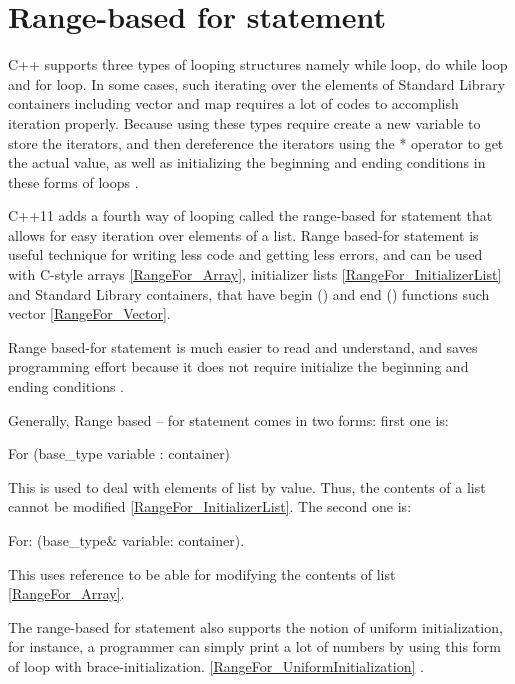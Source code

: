 \documentclass[11pt]{report}
\begin{document}
\section{Range-based for statement}
\label{section: Range-based for statement}
C++ supports three types of looping structures namely while loop, do while loop and for loop. In some cases, such iterating over the elements of Standard Library containers including vector and map requires a lot of codes to accomplish iteration properly. Because using these types require create a new variable to store the iterators, and then dereference the iterators using the * operator to get the actual value, as well as initializing the beginning and ending conditions in these forms of loops \cite{Horstmann:2008:BC}.
\newline

C++11 adds a fourth way of looping called the range-based for statement that allows for easy iteration over elements of a list. Range based-for statement is useful technique for writing less code and getting less errors, and can be used with C-style arrays \ref{RangeFor_Array}, initializer lists \ref{RangeFor_InitializerList} and Standard Library containers, that have begin () and end () functions such vector \ref{RangeFor_Vector}. 
\newline

Range based-for statement is much easier to read and understand, and saves programming effort because it does not require initialize the beginning and ending conditions \cite{Overland:2011:CWF}.
\newline

Generally, Range based – for statement comes in two forms: first one is:
\begin{center}
For (base\_type  variable : container)
\end{center} 

This is used to deal with elements of list by value. Thus, the contents of a list cannot be modified \ref{RangeFor_InitializerList}. The second one is:
\begin{center}
For: (base\_type\& variable: container).
\end{center}

This uses reference to be able for modifying the contents of list \ref{RangeFor_Array}.
\newline

The range-based for statement also supports the notion of uniform initialization, for instance, a programmer can simply print a lot of numbers by using this form of loop with brace-initialization. \ref{RangeFor_UniformInitialization} \cite{Overland:2011:CWF}.
\end{document}
